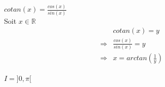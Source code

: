 $cotan(x) = \frac{cos(x)}{sin(x)}$\\
Soit $x\in\mathbb{R}$
\[
  \begin{array}{rl}
                & cotan(x)=y                         \\
    \Rightarrow & \frac{cos(x)}{sin(x)} = y          \\
    \Rightarrow & x = arctan\left(\frac{1}{y}\right) \\
  \end{array}
\]
\begin{result}
  $I = ]0, \pi[$
\end{result}
